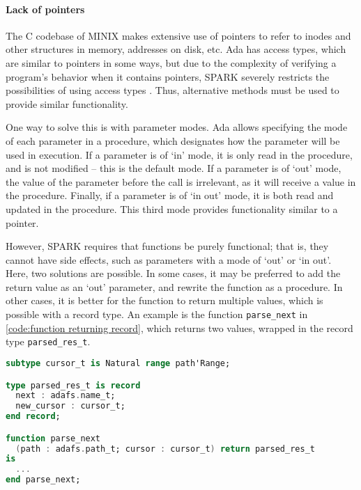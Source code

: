 \paragraph{Lack of pointers}
The C codebase of MINIX makes extensive use of pointers to refer to inodes and other structures in memory, addresses on disk, etc.
Ada has access types, which are similar to pointers in some ways, but due to the complexity of verifying a program's behavior when it contains pointers, SPARK severely restricts the possibilities of using access types \cite{sparkRM}.
Thus, alternative methods must be used to provide similar functionality.

One way to solve this is with parameter modes.
Ada allows specifying the mode of each parameter in a procedure, which designates how the parameter will be used in execution.
If a parameter is of `in' mode, it is only read in the procedure, and is not modified -- this is the default mode.
If a parameter is of `out' mode, the value of the parameter before the call is irrelevant, as it will receive a value in the procedure.
Finally, if a parameter is of `in out' mode, it is both read and updated in the procedure.
This third mode provides functionality similar to a pointer.

However, SPARK requires that functions be purely functional; that is, they cannot have side effects, such as parameters with a mode of `out' or `in out'.
Here, two solutions are possible.
In some cases, it may be preferred to add the return value as an `out' parameter, and rewrite the function as a procedure.
In other cases, it is better for the function to return multiple values, which is possible with a record type.
An example is the function \lstinline[language=Ada]{parse_next} in \autoref{code:function returning record}, which returns two values, wrapped in the record type \lstinline[language=Ada]{parsed_res_t}.

\begin{lstlisting}[caption={Parse function returning the parsed component and the new cursor position (ellipses denote code omitted for brevity)}, label={code:function returning record}, language=Ada]
subtype cursor_t is Natural range path'Range;

type parsed_res_t is record
  next : adafs.name_t;
  new_cursor : cursor_t;
end record;

function parse_next
  (path : adafs.path_t; cursor : cursor_t) return parsed_res_t
is
  ...
end parse_next;
\end{lstlisting}

